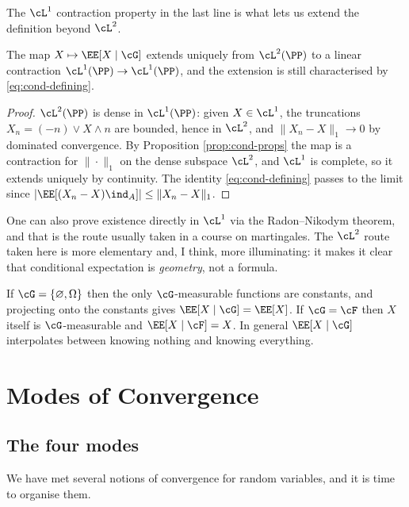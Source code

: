 The $\cL^1$ contraction property in the last line is what lets us extend the definition beyond $\cL^2$.

\begin{theorem}[Extension to $\cL^1$]\label{thm:cond-l1}
	The map $X \mapsto \EE[X\mid\cG]$ extends uniquely from $\cL^2(\PP)$ to a linear contraction $\cL^1(\PP)\to\cL^1(\PP)$, and the extension is still characterised by \eqref{eq:cond-defining}.
\end{theorem}
\begin{proof}
	$\cL^2(\PP)$ is dense in $\cL^1(\PP)$: given $X \in \cL^1$, the truncations $X_n = (-n)\vee X\wedge n$ are bounded, hence in $\cL^2$, and $\|X_n - X\|_1 \to 0$ by dominated convergence. By Proposition \ref{prop:cond-props} the map is a contraction for $\|\cdot\|_1$ on the dense subspace $\cL^2$, and $\cL^1$ is complete, so it extends uniquely by continuity. The identity \eqref{eq:cond-defining} passes to the limit since $|\EE[(X_n - X)\ind_A]| \leq \|X_n - X\|_1$.
\end{proof}

\begin{remark}
	One can also prove existence directly in $\cL^1$ via the Radon--Nikodym theorem, and that is the route usually taken in a course on martingales. The $\cL^2$ route taken here is more elementary and, I think, more illuminating: it makes it clear that conditional expectation is \emph{geometry}, not a formula.
\end{remark}

\begin{example}
	If $\cG = \{\varnothing,\Omega\}$ then the only $\cG$-measurable functions are constants, and projecting onto the constants gives $\EE[X\mid\cG]=\EE[X]$. If $\cG = \cF$ then $X$ itself is $\cG$-measurable and $\EE[X\mid\cF]=X$. In general $\EE[X\mid\cG]$ interpolates between knowing nothing and knowing everything.
\end{example}
\section{Modes of Convergence}

\subsection{The four modes}

We have met several notions of convergence for random variables, and it is time to organise them.

